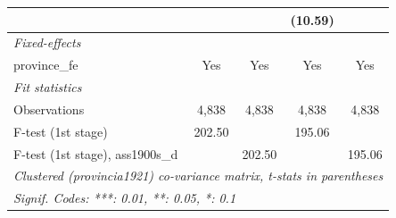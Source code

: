 \begin{table}[htbp]
\begin{tabular}{lcccc}
                                       &                       &                        & (10.59)              &   \\   
      \midrule
      \emph{Fixed-effects}\\
      province\_fe                     & Yes                   & Yes                    & Yes                  & Yes\\  
      \midrule
      \emph{Fit statistics}\\
      Observations                     & 4,838                 & 4,838                  & 4,838                & 4,838\\  
      F-test (1st stage)               & 202.50                &                        & 195.06               & \\  
      F-test (1st stage), ass1900s\_d  &                       & 202.50                 &                      & 195.06\\  
      \midrule \midrule
      \multicolumn{5}{l}{\emph{Clustered (provincia1921) co-variance matrix, t-stats in parentheses}}\\
      \multicolumn{5}{l}{\emph{Signif. Codes: ***: 0.01, **: 0.05, *: 0.1}}\\
   \end{tabular}
\end{table}


